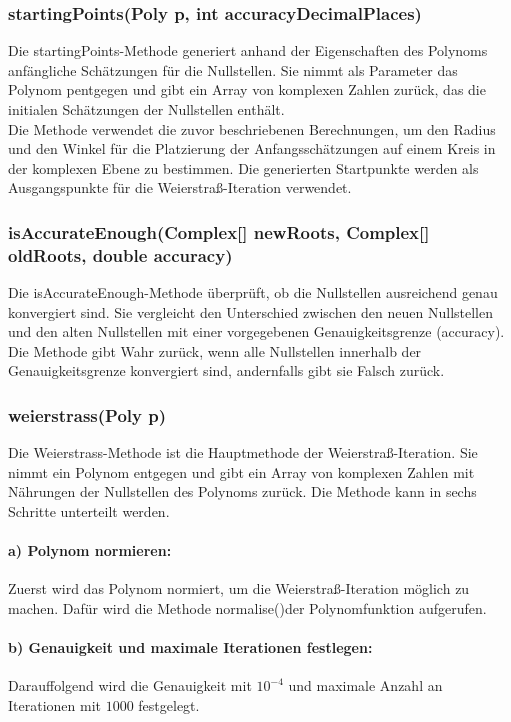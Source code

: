 \documentclass[12pt]{article}
\begin{document}
\subsubsection*{startingPoints(Poly p, int accuracyDecimalPlaces)}
Die \glqq startingPoints\grqq-Methode generiert anhand der Eigenschaften des Polynoms anfängliche Schätzungen für die Nullstellen. Sie nimmt als Parameter das Polynom \glqq p\grqq\space entgegen und gibt ein Array von komplexen Zahlen zurück, das die initialen Schätzungen der Nullstellen enthält.\\
Die Methode verwendet die zuvor beschriebenen Berechnungen, um den Radius und den Winkel für die Platzierung der Anfangsschätzungen auf einem Kreis in der komplexen Ebene zu bestimmen. Die generierten Startpunkte werden als Ausgangspunkte für die Weierstraß-Iteration verwendet.

\subsubsection*{isAccurateEnough(Complex[] newRoots, Complex[] oldRoots, double accuracy)}
Die \glqq isAccurateEnough\grqq-Methode überprüft, ob die Nullstellen ausreichend genau konvergiert sind. Sie vergleicht den Unterschied zwischen den neuen Nullstellen und den alten Nullstellen mit einer vorgegebenen Genauigkeitsgrenze (\glqq accuracy\grqq).\\
Die Methode gibt Wahr zurück, wenn alle Nullstellen innerhalb der Genauigkeitsgrenze konvergiert sind, andernfalls gibt sie Falsch zurück.

\subsubsection*{weierstrass(Poly p)}
Die \glqq Weierstrass\grqq-Methode ist die Hauptmethode der Weierstraß-Iteration. Sie nimmt ein Polynom entgegen und gibt ein Array von komplexen Zahlen mit Nährungen der Nullstellen des Polynoms zurück. Die Methode kann in sechs Schritte unterteilt werden.

\paragraph{a) Polynom normieren:}
Zuerst wird das Polynom normiert, um die Weierstraß-Iteration möglich zu machen. Dafür wird die Methode \glqq normalise()\grqq\space der Polynomfunktion aufgerufen.

\paragraph{b) Genauigkeit und maximale Iterationen festlegen:}
Darauffolgend wird die Genauigkeit mit $10^{-4}$ und maximale Anzahl an Iterationen mit $1000$ festgelegt.
\end{document}
